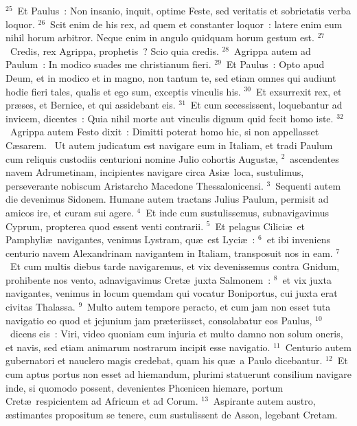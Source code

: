 ${}^{25}$~Et Paulus~: Non insanio, inquit, optime Feste, sed veritatis et sobrietatis verba loquor.
${}^{26}$~Scit enim de his rex, ad quem et constanter loquor~: latere enim eum nihil horum arbitror. Neque enim in angulo quidquam horum gestum est.
${}^{27}$~Credis, rex Agrippa, prophetis~? Scio quia credis.
${}^{28}$~Agrippa autem ad Paulum~: In modico suades me christianum fieri.
${}^{29}$~Et Paulus~: Opto apud Deum, et in modico et in magno, non tantum te, sed etiam omnes qui audiunt hodie fieri tales, qualis et ego sum, exceptis vinculis his.
${}^{30}$~Et exsurrexit rex, et pr\ae ses, et Bernice, et qui assidebant eis.
${}^{31}$~Et cum secessissent, loquebantur ad invicem, dicentes~: Quia nihil morte aut vinculis dignum quid fecit homo iste.
${}^{32}$~Agrippa autem Festo dixit~: Dimitti poterat homo hic, si non appellasset C\ae sarem.
~\lettrine[lines=10,image=true,loversize=0.05,lraise=-0.03]{U}{}t autem judicatum est navigare eum in Italiam, et tradi Paulum cum reliquis custodiis centurioni nomine Julio cohortis August\ae ,
${}^{2}$~ascendentes navem Adrumetinam, incipientes navigare circa Asi\ae\ loca, sustulimus, perseverante nobiscum Aristarcho Macedone Thessalonicensi.
${}^{3}$~Sequenti autem die devenimus Sidonem. Humane autem tractans Julius Paulum, permisit ad amicos ire, et curam sui agere.
${}^{4}$~Et inde cum sustulissemus, subnavigavimus Cyprum, propterea quod essent venti contrarii.
${}^{5}$~Et pelagus Cilici\ae\ et Pamphyli\ae\ navigantes, venimus Lystram, qu\ae\ est Lyci\ae~:
${}^{6}$~et ibi inveniens centurio navem Alexandrinam navigantem in Italiam, transposuit nos in eam.
${}^{7}$~Et cum multis diebus tarde navigaremus, et vix devenissemus contra Gnidum, prohibente nos vento, adnavigavimus Cret\ae\ juxta Salmonem~:
${}^{8}$~et vix juxta navigantes, venimus in locum quemdam qui vocatur Boniportus, cui juxta erat civitas Thalassa.
${}^{9}$~Multo autem tempore peracto, et cum jam non esset tuta navigatio eo quod et jejunium jam pr\ae teriisset, consolabatur eos Paulus,
${}^{10}$~dicens eis~: Viri, video quoniam cum injuria et multo damno non solum oneris, et navis, sed etiam animarum nostrarum incipit esse navigatio.
${}^{11}$~Centurio autem gubernatori et nauclero magis credebat, quam his qu\ae\ a Paulo dicebantur.
${}^{12}$~Et cum aptus portus non esset ad hiemandum, plurimi statuerunt consilium navigare inde, si quomodo possent, devenientes Phœnicen hiemare, portum Cret\ae\ respicientem ad Africum et ad Corum.
${}^{13}$~Aspirante autem austro, \ae stimantes propositum se tenere, cum sustulissent de Asson, legebant Cretam.


